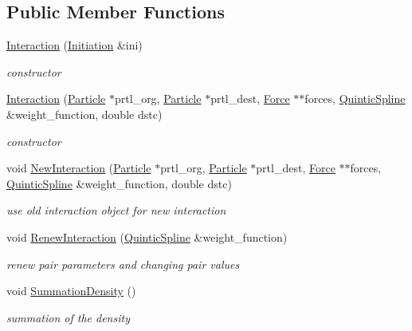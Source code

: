 \subsection*{Public Member Functions}
\begin{CompactItemize}
\item 
\hyperlink{classInteraction_76755da7b86df4bd62c2761d0bed095a}{Interaction} (\hyperlink{classInitiation}{Initiation} \&ini)
\begin{CompactList}\small\item\em constructor \item\end{CompactList}\item 
\hyperlink{classInteraction_9c72b648e00a7bafabc6c96a10492801}{Interaction} (\hyperlink{classParticle}{Particle} $\ast$prtl\_\-org, \hyperlink{classParticle}{Particle} $\ast$prtl\_\-dest, \hyperlink{classForce}{Force} $\ast$$\ast$forces, \hyperlink{classQuinticSpline}{QuinticSpline} \&weight\_\-function, double dstc)
\begin{CompactList}\small\item\em constructor \item\end{CompactList}\item 
void \hyperlink{classInteraction_cba2f76f1316695e948c07d31dfadea9}{NewInteraction} (\hyperlink{classParticle}{Particle} $\ast$prtl\_\-org, \hyperlink{classParticle}{Particle} $\ast$prtl\_\-dest, \hyperlink{classForce}{Force} $\ast$$\ast$forces, \hyperlink{classQuinticSpline}{QuinticSpline} \&weight\_\-function, double dstc)
\begin{CompactList}\small\item\em use old interaction object for new interaction \item\end{CompactList}\item 
void \hyperlink{classInteraction_1adb37756172d95124e56556c9008120}{RenewInteraction} (\hyperlink{classQuinticSpline}{QuinticSpline} \&weight\_\-function)
\begin{CompactList}\small\item\em renew pair parameters and changing pair values \item\end{CompactList}\item 
void \hyperlink{classInteraction_8151e605eb5d7695e0203e2f126c7b4c}{SummationDensity} ()
\begin{CompactList}\small\item\em summation of the density \item\end{CompactList}\item 

\end{CompactItemize}
